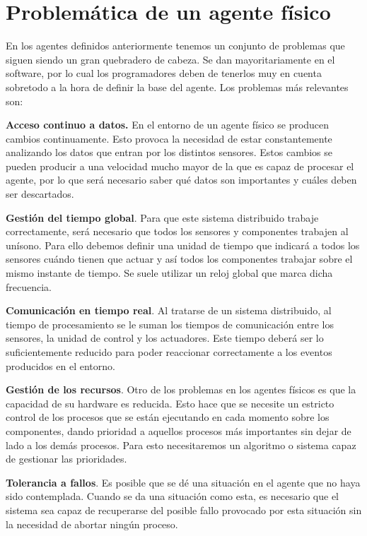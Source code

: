 \documentclass[11pt,oneside,a4paper]{book}
\begin{document}
\section{Problemática de un agente físico}
En los agentes definidos anteriormente tenemos un conjunto de problemas que siguen siendo un gran quebradero de cabeza. Se dan mayoritariamente en el software, por lo cual los programadores deben de tenerlos muy en cuenta sobretodo a la hora de definir la base del agente. Los problemas más relevantes son:

\textbf{Acceso continuo a datos.}	En el entorno de un agente físico se producen cambios continuamente. Esto provoca la necesidad de estar constantemente analizando los datos que entran por los distintos sensores. Estos cambios se pueden producir a una velocidad mucho mayor de la que es capaz de procesar el agente, por lo que será necesario saber qué datos son importantes y cuáles deben ser descartados.

\textbf{Gestión del tiempo global}. Para que este sistema distribuido trabaje correctamente, será necesario que todos los sensores y componentes trabajen al unísono. Para ello debemos definir una unidad de tiempo que indicará a todos los sensores cuándo tienen que actuar y así todos los componentes trabajar sobre el mismo instante de tiempo. Se suele utilizar un reloj global que marca dicha frecuencia.

\textbf{Comunicación en tiempo real}. Al tratarse de un sistema distribuido, al tiempo de procesamiento se le suman los tiempos de comunicación entre los sensores, la unidad de control y los actuadores. Este tiempo deberá ser lo suficientemente reducido para poder reaccionar correctamente a los eventos producidos en el entorno.

\textbf{Gestión de los recursos}. Otro de los problemas en los agentes físicos es que la capacidad de su hardware es reducida. Esto hace que se necesite un estricto control de los procesos que se están ejecutando en cada momento sobre los componentes, dando prioridad a aquellos procesos más importantes sin dejar de lado a los demás procesos. Para esto necesitaremos un algoritmo o sistema capaz de gestionar las prioridades.

\textbf{Tolerancia a fallos}. Es posible que se dé una situación en el agente que no haya sido contemplada. Cuando se da una situación como esta, es necesario que el sistema sea capaz de recuperarse del posible fallo provocado por esta situación sin la necesidad de abortar ningún proceso.
\end{document}

